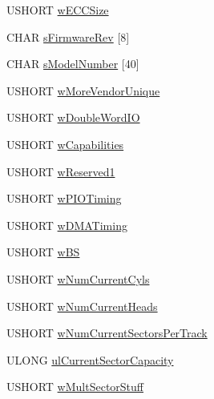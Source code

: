 \begin{DoxyCompactItemize}
\item 
U\-S\-H\-O\-R\-T \hyperlink{structdnp__checkout_1_1___i_d_s_e_c_t_o_r_a790f42f5c0ace8a5bb39a671df8a634c}{w\-E\-C\-C\-Size}
\item 
C\-H\-A\-R \hyperlink{structdnp__checkout_1_1___i_d_s_e_c_t_o_r_a0b942358d2fc3044f06adc9b5cc2df2b}{s\-Firmware\-Rev} \mbox{[}8\mbox{]}
\item 
C\-H\-A\-R \hyperlink{structdnp__checkout_1_1___i_d_s_e_c_t_o_r_a2ac2b59cfda99a4c48a4d7ab78895666}{s\-Model\-Number} \mbox{[}40\mbox{]}
\item 
U\-S\-H\-O\-R\-T \hyperlink{structdnp__checkout_1_1___i_d_s_e_c_t_o_r_a98efb1b320bfa3f80ec0ea97a5862779}{w\-More\-Vendor\-Unique}
\item 
U\-S\-H\-O\-R\-T \hyperlink{structdnp__checkout_1_1___i_d_s_e_c_t_o_r_a16c76f00a72c9ee0becac2583c9812b0}{w\-Double\-Word\-I\-O}
\item 
U\-S\-H\-O\-R\-T \hyperlink{structdnp__checkout_1_1___i_d_s_e_c_t_o_r_a3faff5e016129a27894ad20906ebeb30}{w\-Capabilities}
\item 
U\-S\-H\-O\-R\-T \hyperlink{structdnp__checkout_1_1___i_d_s_e_c_t_o_r_af15af60180b1b2bc6713447fa8a251fa}{w\-Reserved1}
\item 
U\-S\-H\-O\-R\-T \hyperlink{structdnp__checkout_1_1___i_d_s_e_c_t_o_r_a4a9faa28a72369c8a61c13e80c111c42}{w\-P\-I\-O\-Timing}
\item 
U\-S\-H\-O\-R\-T \hyperlink{structdnp__checkout_1_1___i_d_s_e_c_t_o_r_a582b79e28d2b8c9f6fee2c85994f5826}{w\-D\-M\-A\-Timing}
\item 
U\-S\-H\-O\-R\-T \hyperlink{structdnp__checkout_1_1___i_d_s_e_c_t_o_r_ae734db9fe78882ace23993d11b5ad5ad}{w\-B\-S}
\item 
U\-S\-H\-O\-R\-T \hyperlink{structdnp__checkout_1_1___i_d_s_e_c_t_o_r_a80b647305a6961e9ee0c70d56757990a}{w\-Num\-Current\-Cyls}
\item 
U\-S\-H\-O\-R\-T \hyperlink{structdnp__checkout_1_1___i_d_s_e_c_t_o_r_adf194e38aca907e7602621713b129693}{w\-Num\-Current\-Heads}
\item 
U\-S\-H\-O\-R\-T \hyperlink{structdnp__checkout_1_1___i_d_s_e_c_t_o_r_a7fc2c43790f5c0e85137f52fbc73e54b}{w\-Num\-Current\-Sectors\-Per\-Track}
\item 
U\-L\-O\-N\-G \hyperlink{structdnp__checkout_1_1___i_d_s_e_c_t_o_r_ab4132f6c675c2ee03a2e736099c8d5b6}{ul\-Current\-Sector\-Capacity}
\item 
U\-S\-H\-O\-R\-T \hyperlink{structdnp__checkout_1_1___i_d_s_e_c_t_o_r_a528c87d98538b3b02280faa23ffc87d5}{w\-Mult\-Sector\-Stuff}

\end{DoxyCompactItemize}
